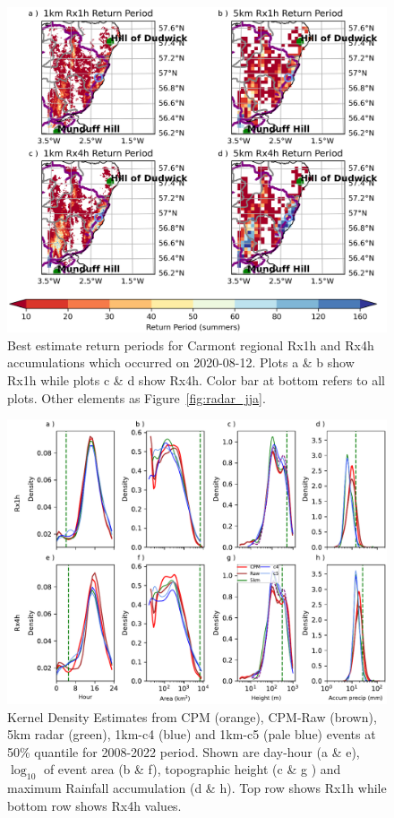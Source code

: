 \documentclass[11pt,a4paper]{article}
\begin{document}
\begin{figure}
	\centering
	\includegraphics[width=\linewidth]{map_return_prds}
	\caption{Best estimate return periods for Carmont regional Rx1h and Rx4h accumulations which occurred on 2020-08-12. Plots a \& b show Rx1h while plots c \& d show Rx4h. Color bar at bottom refers to all plots. Other elements as Figure~\ref{fig:radar_jja}. } 
	\label{fig:map_rtn_prd}
\end{figure}


\begin{figure}
	\centering
	\includegraphics[width=\linewidth]{kde_smooth_events}
	\caption{Kernel Density Estimates from  CPM (orange), CPM-Raw (brown), 5km radar (green), 1km-c4 (blue) and 1km-c5 (pale blue) events at 50\% quantile for 2008-2022 period. Shown are day-hour (a \& e),$\log_{10}$ of event area (b \& f),  topographic height (c \& g ) and maximum Rainfall accumulation (d \& h). Top row shows Rx1h while bottom row shows Rx4h values.}
\end{figure}
\end{document}
